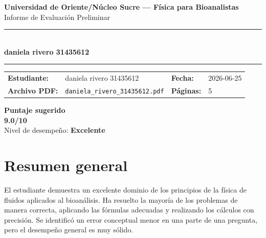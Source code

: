 \documentclass[11pt,a4paper]{article}
\begin{document}
\begin{center}
  {\Large\bfseries\color{azulTitulo} Universidad de Oriente/Núcleo Sucre --- Física para Bioanalistas}\\[4pt]
  {\large Informe de Evaluación Preliminar}\\[12pt]
  \rule{\linewidth}{1.2pt}\\[6pt]
  {\LARGE\bfseries daniela rivero 31435612}\\[4pt]
  \rule{\linewidth}{0.6pt}
\end{center}

\vspace{4pt}
\begin{tcolorbox}[cajaTitulo, title=Datos del informe]
\begin{tabular}{@{}llll@{}}
  \textbf{Estudiante:}  & daniela rivero 31435612  &
  \textbf{Fecha:}       & 2026-06-25 \\[4pt]
  \textbf{Archivo PDF:} & \texttt{daniela\_rivero\_31435612.pdf}  &
  \textbf{Páginas:}     & 5 \\
\end{tabular}
\end{tcolorbox}

\vspace{6pt}
\begin{center}
  \begin{tcolorbox}[
    enhanced,
    colback=white, colframe=desempeno_excelente,
    width=0.62\linewidth,
    boxrule=2pt,
    halign=center, valign=center,
    top=8pt, bottom=8pt,
  ]
    \centering
    {\large\bfseries Puntaje sugerido}\\[6pt]
    {\Huge\bfseries\color{desempeno_excelente} 9.0/10}\\[6pt]
    {\large Nivel de desempeño: \textbf{\color{desempeno_excelente} Excelente}}
  \end{tcolorbox}
\end{center}

\section*{Resumen general}
El estudiante demuestra un excelente dominio de los principios de la física de fluidos aplicados al bioanálisis. Ha resuelto la mayoría de los problemas de manera correcta, aplicando las fórmulas adecuadas y realizando los cálculos con precisión. Se identificó un error conceptual menor en una parte de una pregunta, pero el desempeño general es muy sólido.
\end{document}
